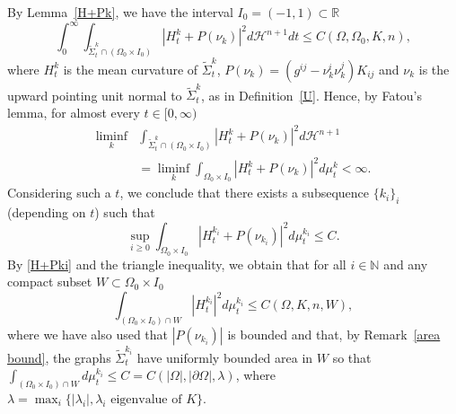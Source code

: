 \documentclass[11pt]{amsart}
\def\R{\mathbb{R}}
\def\N{\mathbb{N}}
\def\l{\lambda}
\def\H{\mathcal{H}}
\def\wt{\widetilde}
\begin{document}
By Lemma~\ref{H+Pk}, we have the interval $I_0=(-1, 1)\subset \R$
\begin{equation}\label{24I0}
\int_{0}^{\infty}\int_{\wt\Sigma^{k}_t\cap (\Omega_0\times I_0)}|H^k_t+ P(\nu_k)|^2d\H^{n+1}dt\le C(\Omega, \Omega_0, K, n), 
\end{equation}
where $H^k_t$ is the mean curvature of $\wt\Sigma^{k}_t$, $P(\nu_k)=\left(g^{ij}-\nu^i_{k}\nu^j_{k}\right) K_{ij}$ and $\nu_{k}$ is the upward pointing unit normal to $\wt\Sigma^{k}_t$, as in Definition~\ref{U}. Hence, by Fatou's lemma, for almost every $t\in [0,\infty)$
\[
\begin{split}
\liminf_k&\int_{\wt\Sigma^{k}_t\cap (\Omega_0\times I_0)}|H^k_t+ P(\nu_k)|^2d\H^{n+1}\\
&=\liminf_k\int_{\Omega_0\times I_0}|H^k_t+ P(\nu_k)|^2d\mu_t^k<\infty. 
\end{split}
\]
Considering such a $t$, we conclude that 
there exists a subsequence $\{k_i\}_i$ (depending on $t$) such that
\begin{equation}\label{H+Pki}
\sup_{i\ge 0}\int_{\Omega_0\times I_0}|H_t^{k_i}+P(\nu_{k_i})|^2d\mu_t^{k_i}\le C.
\end{equation}
By \eqref{H+Pki}  and the triangle inequality, we obtain that for all $i\in\N$ and any compact subset $W\subset\Omega_0\times I_0$
\begin{equation}\label{Ht2bound}
\int_{(\Omega_0\times I_0)\cap W}|H_t^{k_i}|^2d\mu_t^{k_i}\le C( \Omega, K, n, W),
\end{equation}
where we have also used that $|P(\nu_{k_i})|$ is bounded and that, by Remark~\ref{area bound},  the graphs  $\wt \Sigma_t^{k_i}$ have uniformly bounded area in $W$ so that $\int_{(\Omega_0\times I_0)\cap W}d\mu_t^{k_i}\le C=C(|\Omega|, |\partial\Omega|,  \l)$, where  $\lambda=\max_i\{|\l_i|, \l_i\text{  eigenvalue of  } K\}$. 
\end{document}
